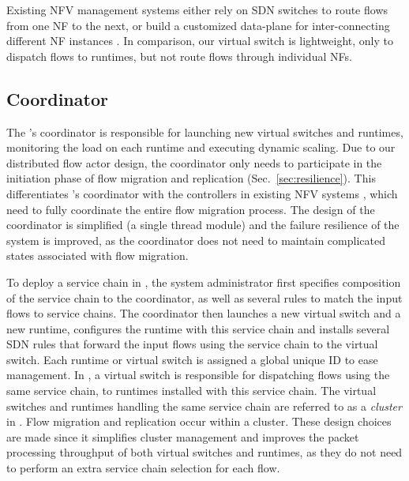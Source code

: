 
Existing NFV management systems either rely on SDN switches \cite{gember2012stratos, gember2015opennf} to route flows from one NF to the next, or build a customized data-plane for inter-connecting different NF instances \cite{palkar2015e2}. In comparison, our virtual switch is lightweight, only to dispatch flows to runtimes, but not route flows through individual NFs.


\subsection{Coordinator}
\label{sec:coordinator}

The \nfactor's coordinator is responsible for launching new virtual switches and runtimes, monitoring the load on each runtime and executing dynamic scaling. Due to our distributed flow actor design, the coordinator only needs to participate in the initiation phase of flow migration and replication (Sec.~\ref{sec:resilience}). This differentiates \nfactor's coordinator with the controllers in existing NFV systems \cite{gember2015opennf}\cite{rajagopalan2013split}, which need to fully coordinate the entire flow migration process.
The design of the coordinator is simplified (a single thread module) and the failure resilience of the system is improved, as the coordinator does not need to maintain complicated states associated with flow migration.

To deploy a service chain in \nfactor, the system administrator first specifies composition of the service chain to the coordinator, as well as several rules to match the input flows to service chains. %
The coordinator then launches a new virtual switch and a new runtime, configures the runtime with this service chain and installs several SDN rules that forward the input flows using the service chain to the virtual switch. %
Each runtime or virtual switch is assigned a global unique ID to ease management.  In \nfactor, a virtual switch is responsible for dispatching flows using the same service chain, to runtimes installed with this service chain. The virtual switches and runtimes handling the same service chain are referred to as a {\em cluster} in \nfactor. Flow migration and replication occur within a cluster. These design choices are made since it simplifies cluster management and improves the packet processing throughput of both virtual switches and runtimes, as they do not need to perform an extra service chain selection for each flow.


